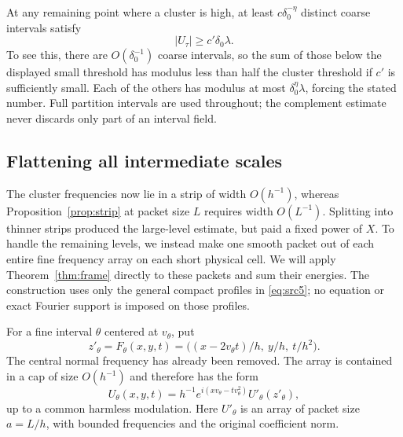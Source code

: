At any remaining point where a cluster is high, at least
$c\delta_0^{-\eta}$ distinct coarse intervals satisfy
\begin{equation}\label{eq:dyadic-significant-intervals}
 |U_\tau|\geq c'\delta_0\lambda.
\end{equation}
To see this, there are $O(\delta_0^{-1})$ coarse intervals, so the sum
of those below the displayed small threshold has modulus less than
half the cluster threshold if $c'$ is sufficiently small.  Each of the
others has modulus at most $\delta_0^\eta\lambda$, forcing the stated
number.  Full partition intervals are used throughout; the complement
estimate never discards only part of an interval field.

\subsection{Flattening all intermediate scales}

The cluster frequencies now lie in a strip of width $O(h^{-1})$, whereas
Proposition~\ref{prop:strip} at packet size $L$ requires width $O(L^{-1})$.
Splitting into thinner strips produced the large-level estimate, but paid
a fixed power of $X$. To handle the remaining levels, we instead make one
smooth packet out of each entire fine frequency array on each short
physical cell. We will apply Theorem~\ref{thm:frame} directly to these
packets and sum their energies. The construction uses only the general
compact profiles in \eqref{eq:src5}; no equation or exact Fourier
support is imposed on those profiles.

For a fine interval $\theta$ centered at $v_\theta$, put
\begin{equation}\label{eq:dyadic-child-coordinates}
 z'_\theta=F_\theta(x,y,t)
   =\big((x-2v_\theta t)/h,\ y/h,\ t/h^2\big).
\end{equation}
The central normal frequency has already been removed.  The array is
contained in a cap of size $O(h^{-1})$ and therefore has the form
\begin{equation}\label{eq:dyadic-child-field}
 U_\theta(x,y,t)
 =h^{-1}e^{i(xv_\theta-tv_\theta^2)}U'_\theta(z'_\theta),
\end{equation}
up to a common harmless modulation.  Here $U'_\theta$ is an array of
packet size $a=L/h$, with bounded frequencies and the original
coefficient norm.

